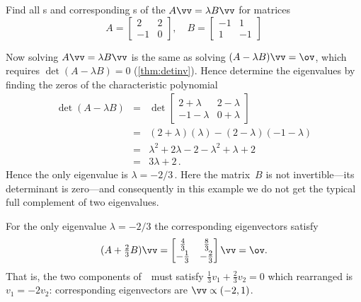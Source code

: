 \begin{example} \label{eg:}
Find all s and corresponding s of the  \(A\vv=\lambda B\vv\) for matrices
\begin{equation*}
A=\begin{bmatrix} 2&2\\-1&0 \end{bmatrix},\quad
B=\begin{bmatrix} -1&1\\1&-1 \end{bmatrix}
\end{equation*}
\begin{solution} 
Now solving \(A\vv=\lambda B\vv\) is the same as solving \((A-\lambda B)\vv=\ov\), which requires \(\det(A-\lambda B)=0\) (\autoref{thm:detinv}).
Hence determine the eigenvalues by finding the zeros of the characteristic polynomial
\begin{eqnarray*}
\det(A-\lambda B)
&=&\det\begin{bmatrix} 2+\lambda&2-\lambda\\-1-\lambda&0+\lambda \end{bmatrix}
\\&=&(2+\lambda)(\lambda)-(2-\lambda)(-1-\lambda)
\\&=&\lambda^2+2\lambda-2-\lambda^2+\lambda+2
\\&=&3\lambda+2\,.
\end{eqnarray*}
Hence the only eigenvalue is \(\lambda=-2/3\)\,.
Here the matrix~\(B\) is not invertible---its determinant is zero---and consequently in this example we do not get the typical full complement of two eigenvalues.

For the only eigenvalue \(\lambda=-2/3\) the corresponding eigenvectors satisfy
\begin{equation*}
(A+\tfrac23B)\vv=\begin{bmatrix} \tfrac43&\tfrac83\\-\tfrac13&-\tfrac23 \end{bmatrix}\vv=\ov.
\end{equation*}
That is, the two components of~\vv\ must satisfy \(\tfrac13v_1+\tfrac23v_2=0\) which rearranged is \(v_1=-2v_2\): corresponding eigenvectors are \(\vv\propto(-2,1)\).
\end{solution}
\end{example}








